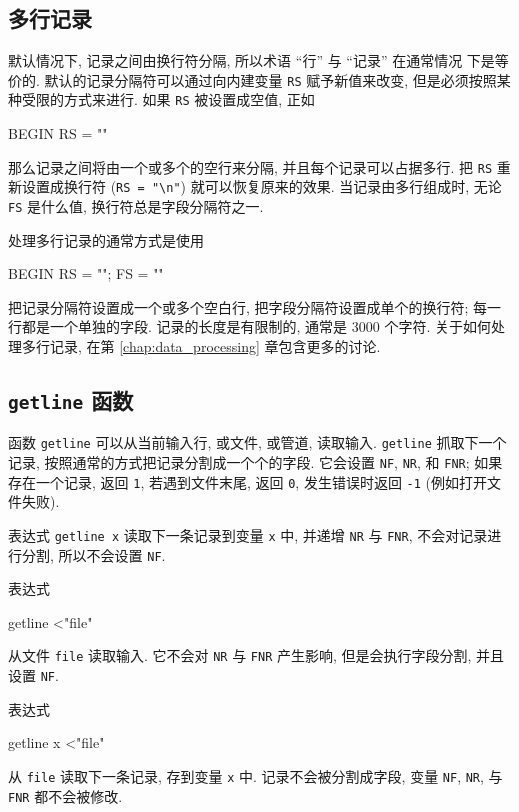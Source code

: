\subsection{多行记录}
\label{subsec:multiline_records}

默认情况下, 记录之间由换行符分隔, 所以术语 ``行'' 与 ``记录'' 在通常情况
下是等价的. 默认的记录分隔符可以通过向内建变量 \verb'RS' 赋予新值来改变,
但是必须按照某种受限的方式来进行. 如果 \verb'RS' 被设置成空值, 正如 
\begin{awkcode}
    BEGIN { RS = "" }
\end{awkcode}
那么记录之间将由一个或多个的空行来分隔, 并且每个记录可以占据多行. 把
\verb'RS' 重新设置成换行符 (\verb'RS = "\n"') 就可以恢复原来的效果.
当记录由多行组成时, 无论 \verb'FS' 是什么值, 换行符总是字段分隔符之一.

处理多行记录的通常方式是使用
\begin{awkcode}
    BEGIN { RS = ""; FS = "\n" }
\end{awkcode}
把记录分隔符设置成一个或多个空白行, 把字段分隔符设置成单个的换行符; 每一
行都是一个单独的字段. 记录的长度是有限制的, 通常是 3000 个字符. 
关于如何处理多行记录, 在第 \ref{chap:data_processing} 章包含更多的讨论.

\subsection{\texttt{getline} 函数}
\label{subsec:the_getline_function}

函数 \verb'getline' 可以从当前输入行, 或文件, 或管道, 读取输入. 
\verb'getline' 抓取下一个记录, 按照通常的方式把记录分割成一个个的字段. 
它会设置 \verb'NF', \verb'NR', 和 \verb'FNR'; 如果存在一个记录, 返回
\verb'1',
若遇到文件末尾, 返回 \verb'0', 发生错误时返回 \verb'-1'
(例如打开文件失败).

表达式 \verb'getline x' 读取下一条记录到变量 \verb'x' 中, 并递增 \verb'NR'
与 \verb'FNR', 不会对记录进行分割, 所以不会设置 \verb'NF'.

表达式 
\begin{awkcode}
    getline <"file"
\end{awkcode}
从文件 \verb'file' 读取输入. 它不会对 \verb'NR' 与 \verb'FNR' 产生影响,
但是会执行字段分割, 并且设置 \verb'NF'.

表达式 
\begin{awkcode}
    getline x <"file"
\end{awkcode}
从 \verb'file' 读取下一条记录, 存到变量 \verb'x' 中. 记录不会被分割成字段,
变量 \verb'NF', \verb'NR', 与 \verb'FNR' 都不会被修改.

